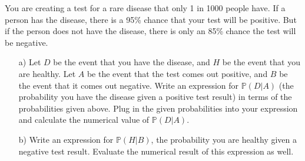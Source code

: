 \documentclass[]{article}
\newif\ifsolutions
\renewcommand{\answer}[1]{{\color{mydarkblue}\textbf{Solution:}#1}}
\begin{document}
\begin{qunlist}

You are creating a test for a rare disease that only 1 in 1000 people have. If a person has the disease, there is a 95\% chance that your test will be positive.  But if the person does not have the disease, there is only an 85\% chance the test will be negative.

\begin{enumerate}
\qpart 
\item[a)] Let $D$ be the event that you have the disease, and $H$ be the event that you are healthy.  Let $A$ be the event that the test comes out positive, and $B$ be the event that it comes out negative.  Write an expression for $\mathbb{P}(D|A)$ (the probability you have the disease given a positive test result) in terms of the probabilities given above.  Plug in the given probabilities into your expression and calculate the numerical value of $\mathbb{P}(D|A)$.

\ifsolutions{ \answer {
\[ P(D|A) = \frac{P(A|D)P(D)}{P(A)} = \frac{P(A|D)P(D)}{P(A|D)P(D) + P(A|H)P(H)} = \frac{0.95 \cdot 0.01}{0.95 \cdot 0.01 + 0.15 \cdot 0.99} = 6\% \]
}}\fi

\qpart
\item[b)] Write an expression for $\mathbb{P}(H|B)$, the probability you are healthy given a negative test result.  Evaluate the numerical result of this expression as well.

\ifsolutions{ \answer {
\[ P(H|B) = \frac{P(B|H)P(H)}{P(B)} = \frac{P(B|H)P(H)}{P(B|H)P(H) + P(B|D)P(D)} = \frac{0.85 \cdot 0.99}{0.85 \cdot 0.99 + 0.05 \cdot 0.01} = 99.9\% \]
}}\fi


\end{enumerate}


\end{qunlist}
\end{document}
